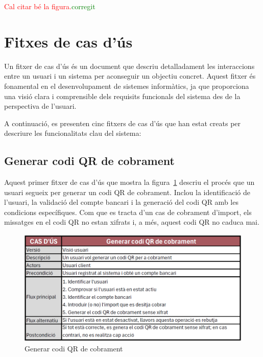 \documentclass[a4paper,12pt,twoside]{ThesisStyle}
\newcommand{\pau}[1]{\textcolor{red}{#1}}
\newcommand{\sudan}[1]{\textcolor{green}{#1}}
\begin{document}
\pau{Cal citar bé la figura.}\sudan{corregit}



\section{Fitxes de cas d'ús}
\label{sec: fitxes de cas d'ús}

Un fitxer de cas d'ús és un document que descriu detalladament les interaccions entre un usuari i un sistema per aconseguir un objectiu concret. Aquest fitxer és fonamental en el desenvolupament de sistemes informàtics, ja que proporciona una visió clara i comprensible dels requisits funcionals del sistema des de la perspectiva de l'usuari.

A continuació, es presenten cinc fitxers de cas d'ús que han estat creats per descriure les funcionalitats clau del sistema:

\subsection{Generar codi QR de cobrament}
\label{subsec:Generar codi QR de cobrament}

Aquest primer fitxer de cas d'ús que mostra la figura~\ref{fig:Generar codi QR de cobrament} descriu el procés que un usuari segueix per generar un codi QR de cobrament. Inclou la identificació de l'usuari, la validació del compte bancari i la generació del codi QR amb les condicions específiques. Com que es tracta d'un cas de cobrament d'import, els missatges en el codi QR no estan xifrats i, a més, aquest codi QR no caduca mai.


\begin{figure}[h]
    \centering
    \includegraphics[width=1\textwidth]{imatges/f1.png}
    \caption{Generar codi QR de cobrament}
    \label{fig:Generar codi QR de cobrament}
\end{figure}
\end{document}
